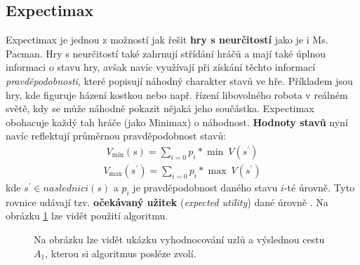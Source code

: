 \subsection*{Expectimax}
Expectimax \cite{mas} je jednou z možností jak řešit \textbf{hry s neurčitostí} jako je i Ms. Pacman. Hry s neurčitostí také zahrnují střídání hráčů a mají také úplnou informaci o stavu hry, avšak navíc využívají při získání těchto informací \textit{pravděpodobnosti}, které popisují náhodný charakter stavů ve hře. Příkladem jsou hry, kde figuruje házení kostkou nebo např. řízení libovolného robota v reálném světě, kdy se může náhodně pokazit nějaká jeho součástka. Expectimax obohacuje každý tah hráče (jako Minimax) o náhodnost. \textbf{Hodnoty stavů} nyní navíc reflektují průměrnou pravděpodobnost stavů:
\begin{align}
V_{\min}(s) = \sum_{i=0} p_i * \min \: V(s^\prime)
\end{align}
\begin{align}
V_{\max}(s^\prime) = \sum_{i=0} p_i * \max \: V(s^\prime)
\end{align}
kde $s^\prime \in naslednici(s)$ a $p_i$ je pravděpodobnost daného stavu $i$-té úrovně.
\newline
Tyto rovnice udávají tzv. \textbf{očekávaný užitek} (\textit{expected utility}) dané úrovně \cite{mas}. Na obrázku \ref{img:expectimax} lze vidět použití algoritmu.
\newpage

\begin{figure}[!htbp]
\begin{center}
  \caption{Na obrázku lze vidět ukázku vyhodnocování uzlů a výslednou cestu $A_1$, kterou si algoritmus posléze zvolí.}
  \label{img:expectimax}
\end{center}
\end{figure}

